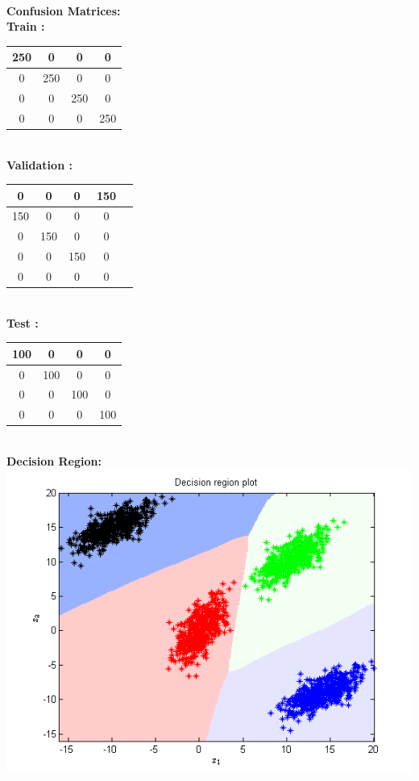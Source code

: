 \documentclass{article}
\begin{document}
\begin{flushleft}
\textbf{\\[5pt]Confusion Matrices: \\[10pt]}
\textbf{Train :\\[5pt]}

\begin{tabular}{|c|c|c|c|} \hline 250 & 0 & 0 & 0\\ \hline 0 & 250 & 0 & 0\\ \hline 0 & 0 & 250 & 0\\ \hline 0 & 0 & 0 & 250 \\ \hline \end{tabular}


\textbf{\\[10pt]Validation :\\[5pt]}

\begin{tabular}{|c|c|c|c|c|} \hline  0 & 0 & 0 & 150\\ \hline 150 & 0 & 0 & 0\\ \hline 0 & 150 & 0 & 0\\ \hline  0 & 0 & 150 & 0\\ \hline 0 & 0 & 0 & 0 \\ \hline \end{tabular}

\textbf{\\[10pt]Test :\\[5pt]}


\begin{tabular}{|c|c|c|c|} \hline 100 & 0 & 0 & 0\\ \hline 0 & 100 & 0 & 0\\ \hline 0 & 0 & 100 & 0\\ \hline 0 & 0 & 0 & 100 \\ \hline \end{tabular}



\newpage
\textbf{\\[10pt]Decision Region:\\[5pt]}
\includegraphics[scale=1]{Classification/linearlySeparable/decn_region_nn}


\end{flushleft}
\end{document}
